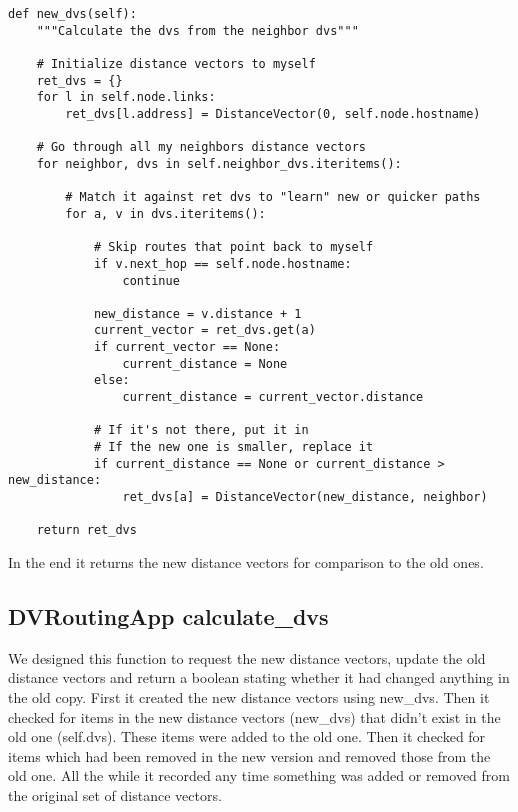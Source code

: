 \documentclass[11pt]{article}
\begin{document}
\begin{lstlisting}
def new_dvs(self):
    """Calculate the dvs from the neighbor dvs"""

    # Initialize distance vectors to myself
    ret_dvs = {}
    for l in self.node.links:
        ret_dvs[l.address] = DistanceVector(0, self.node.hostname)

    # Go through all my neighbors distance vectors
    for neighbor, dvs in self.neighbor_dvs.iteritems():

        # Match it against ret dvs to "learn" new or quicker paths
        for a, v in dvs.iteritems():

            # Skip routes that point back to myself
            if v.next_hop == self.node.hostname:
                continue

            new_distance = v.distance + 1
            current_vector = ret_dvs.get(a)
            if current_vector == None:
                current_distance = None
            else:
                current_distance = current_vector.distance

            # If it's not there, put it in
            # If the new one is smaller, replace it
            if current_distance == None or current_distance > new_distance:
                ret_dvs[a] = DistanceVector(new_distance, neighbor)

    return ret_dvs
\end{lstlisting}

\vspace{5mm}

In the end it returns the new distance vectors for comparison to the old ones.

\subsection{DVRoutingApp calculate\_dvs}

We designed this function to request the new distance vectors, update the old distance vectors and return a boolean stating whether it had changed anything in the old copy. First it created the new distance vectors using new\_dvs. Then it checked for items in the new distance vectors (new\_dvs) that didn't exist in the old one (self.dvs). These items were added to the old one. Then it checked for items which had been removed in the new version and removed those from the old one. All the while it recorded any time something was added or removed from the original set of distance vectors.

\vspace{5mm}
\end{document}
